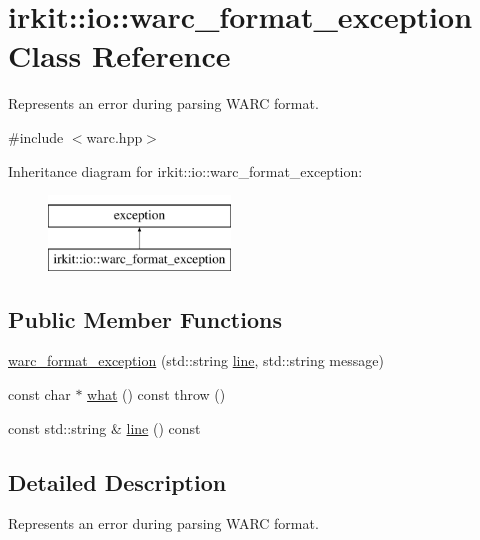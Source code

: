 \hypertarget{classirkit_1_1io_1_1warc__format__exception}{}\section{irkit\+:\+:io\+:\+:warc\+\_\+format\+\_\+exception Class Reference}
\label{classirkit_1_1io_1_1warc__format__exception}


Represents an error during parsing W\+A\+RC format.  




{\ttfamily \#include $<$warc.\+hpp$>$}

Inheritance diagram for irkit\+:\+:io\+:\+:warc\+\_\+format\+\_\+exception\+:\begin{figure}[H]
\begin{center}
\leavevmode
\includegraphics[height=2.000000cm]{classirkit_1_1io_1_1warc__format__exception}
\end{center}
\end{figure}
\subsection*{Public Member Functions}
\begin{DoxyCompactItemize}
\item 
\mbox{\hyperlink{classirkit_1_1io_1_1warc__format__exception_a2c328f2114bf1bba82e8a1b88b3bd6ce}{warc\+\_\+format\+\_\+exception}} (std\+::string \mbox{\hyperlink{classirkit_1_1io_1_1warc__format__exception_abf4c3f70a23e8b7b602db1ffa2c3b416}{line}}, std\+::string message)
\item 
const char $\ast$ \mbox{\hyperlink{classirkit_1_1io_1_1warc__format__exception_a2571f83ce38f5b6765e008fd643f38c5}{what}} () const  throw ()
\item 
const std\+::string \& \mbox{\hyperlink{classirkit_1_1io_1_1warc__format__exception_abf4c3f70a23e8b7b602db1ffa2c3b416}{line}} () const
\end{DoxyCompactItemize}


\subsection{Detailed Description}
Represents an error during parsing W\+A\+RC format. 

